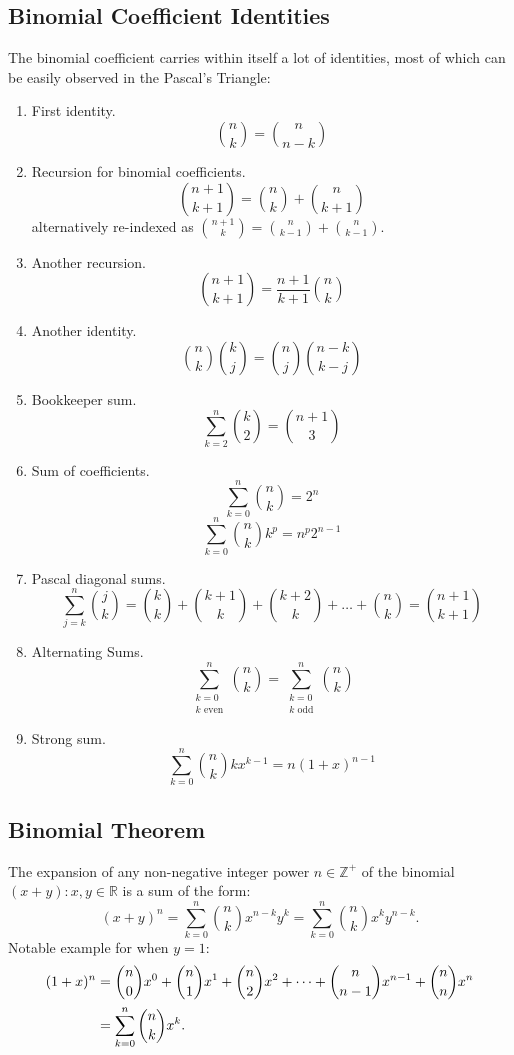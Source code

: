 \documentclass{article}
\newenvironment{theorem}[1]{%
    \trivlist
    \item[\hskip\labelsep\textbf{Theorem. #1.}]
    \ignorespaces
}{%
    \endtrivlist
}
\newenvironment{identities}[1]{%
    \trivlist
    \item[\hskip\labelsep\textbf{Identities. #1.}]
    \ignorespaces
}{%
    \endtrivlist
}
\begin{document}
\subsection{Binomial Coefficient Identities}

\begin{identities}{Binomial Coefficient}
    The binomial coefficient carries within itself a lot of identities, most of which can be easily observed in the Pascal's Triangle:
    \begin{enumerate}
        \item First identity.
        \[\binom{n}{k}=\binom{n}{n-k}\]
        \item Recursion for binomial coefficients.
        \[\binom{n+1}{k+1}=\binom{n}{k}+\binom{n}{k+1}\]
        alternatively re-indexed as $\binom{n+1}{k}=\binom{n}{k-1}+\binom{n}{k-1}$.
        \item Another recursion.
        \[\binom{n+1}{k+1} = \frac{n+1}{k+1} \binom{n}{k}\]
        \item Another identity.
        \[\binom{n}{k}\binom{k}{j} = \binom{n}{j}\binom{n-k}{k-j}\]
        \item Bookkeeper sum.
        \[\sum_{k=2}^{n} \binom{k}{2} = \binom{n+1}{3}\]
        \item Sum of coefficients.
        \[\sum_{k=0}^{n} \binom{n}{k} = 2^n\]
        \[\sum_{k=0}^{n} \binom{n}{k} k^p = n^p 2^{n-1}\]
        \item Pascal diagonal sums.
        \[\sum_{j=k}^{n} \binom{j}{k}=\binom{k}{k} + \binom{k+1}{k} + \binom{k+2}{k} + \dots + \binom{n}{k} = \binom{n+1}{k+1}\]
        \item Alternating Sums.
        \[\sum_{\substack{k=0 \\ k \text{ even}}}^{n} \binom{n}{k} =\sum_{\substack{k=0 \\ k \text{ odd}}}^{n} \binom{n}{k}\]
        \item Strong sum.
        \[\sum_{k=0}^{n} \binom{n}{k} kx^{k-1} = n(1+x)^{n-1}\]
    \end{enumerate}
\end{identities}

\subsection{Binomial Theorem}

\begin{theorem}{Binomial Theorem}
    The expansion of any non-negative integer power $n\in\mathbb{Z}^{+}$ of the binomial $(x + y): x,y\in\mathbb{R}$ is a sum of the form:
    \[ (x+y)^{n}=\sum _{k=0}^{n} \binom{n}{k} x^{n-k}y^{k}=\sum _{k=0}^{n} \binom{n}{k} x^{k}y^{n-k}. \]
    Notable example for when $y=1$:
    $$
    \begin{aligned}
        (1+x)^{n}&=\binom{n}{0}x^{0}+\binom{n}{1}x^{1}+\binom{n}{2}x^{2}+\cdots +\binom{n}{n-1}x^{n-1}+\binom{n}{n}x^{n}\\
        &=\sum _{k=0}^{n}\binom{n}{k}x^{k}.{\vphantom {\Bigg )}}
    \end{aligned}
    $$
\end{theorem}
\end{document}
